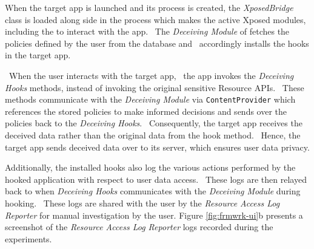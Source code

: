 When the target app is launched and its process is created, the \textit{XposedBridge} class is loaded along side in the process which makes the active Xposed modules, including the \framework{} to interact with the app.
~The \textit{Deceiving Module} of \framework{} fetches the policies defined by the user from the database and ~accordingly installs the hooks in the target app.

~When the user interacts with the target app, ~the app invokes the \textit{Deceiving Hooks} methods, instead of invoking the original sensitive Resource APIs. ~These methods communicate with the \textit{Deceiving Module} via \texttt{ContentProvider} which references the stored policies to make informed decisions and sends over the policies back to the \textit{Deceiving Hooks}. ~Consequently, the target app receives the deceived data rather than the original data from the hook method. ~Hence, the target app sends deceived data over to its server, which ensures user data privacy. 

Additionally, the installed hooks also log the various actions performed by the hooked application with respect to user data access. ~These logs are then relayed back to \framework{} when \textit{Deceiving Hooks} communicates with the \textit{Deceiving Module} during hooking. ~These logs are shared with the user by the \textit{Resource Access Log Reporter} for manual investigation by the user. Figure \ref{fig:frmwrk-ui}b presents a screenshot of the \textit{Resource Access Log Reporter} logs recorded during the experiments.



